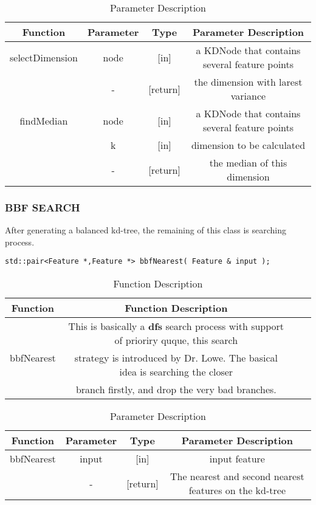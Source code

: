 \documentclass[paper=a4, fontsize=11pt]{scrartcl} %
\numberwithin{equation}{section} %
\numberwithin{figure}{section} %
\numberwithin{table}{section} %
\begin{document}
\begin{table}[h]
    \centering
    \begin{tabular}{|c|c|c|c|}
        \hline
        \textbf{Function} & \textbf{Parameter} & \textbf{Type} & \textbf{Parameter Description} \\\hline
            selectDimension & node & [in] & a KDNode that contains several feature points \\
                            & - & [return] & the dimension with larest variance \\\hline
            findMedian & node& [in] & a KDNode that contains several feature points \\
            & k & [in] & dimension to be calculated \\
            & - & [return] & the median of this dimension \\\hline
    \end{tabular}
    \caption{Parameter Description}\label{nolock}
\end{table}

\subsubsection{BBF SEARCH}

After generating a balanced kd-tree, the remaining of this class is searching process.

\begin{lstlisting}
std::pair<Feature *,Feature *> bbfNearest( Feature & input );
\end{lstlisting}

\begin{table}[h]
    \centering
    \begin{tabular}{|c|c| lp{}}
        \hline
        \textbf{Function} & \textbf{Function Description} \\\hline
      \multirow{3}{*}{bbfNearest} & This is basically a \textbf{dfs} search process with support of prioriry quque, this search  \\& strategy is introduced by Dr. Lowe\cite{sift}. The basical idea is searching the closer \\& branch firstly, and drop the very bad branches.\\\hline
    \end{tabular}
    \caption{Function Description}\label{nolock}
\end{table}

\begin{table}[H]
    \centering
    \begin{tabular}{|c|c|c|c|}
        \hline
        \textbf{Function} & \textbf{Parameter} & \textbf{Type} & \textbf{Parameter Description} \\\hline
            bbfNearest & input & [in] & input feature \\
                            & - & [return] & The nearest and second nearest features on the kd-tree\\\hline
    \end{tabular}
    \caption{Parameter Description}\label{nolock}
\end{table}
\end{document}
